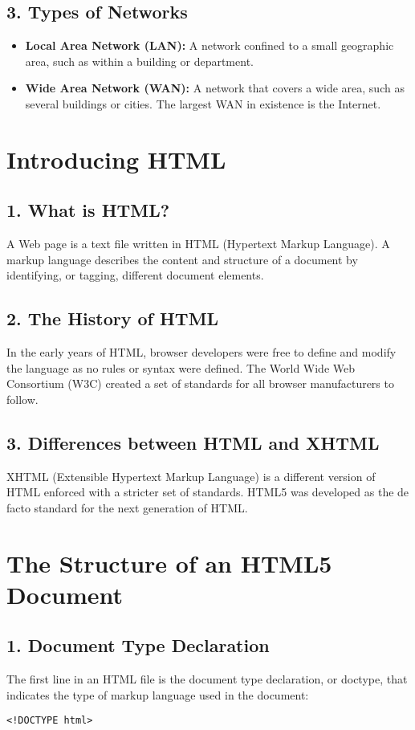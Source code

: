 \documentclass{article}
\begin{document}
\subsection*{3. Types of Networks}
\begin{itemize}
    \item \textbf{Local Area Network (LAN):} A network confined to a small geographic area, such as within a building or department.
    \item \textbf{Wide Area Network (WAN):} A network that covers a wide area, such as several buildings or cities. The largest WAN in existence is the Internet.
\end{itemize}

\section{Introducing HTML}
\subsection*{1. What is HTML?}
A Web page is a text file written in HTML (Hypertext Markup Language). A markup language describes the content and structure of a document by identifying, or tagging, different document elements.

\subsection*{2. The History of HTML}
In the early years of HTML, browser developers were free to define and modify the language as no rules or syntax were defined. The World Wide Web Consortium (W3C) created a set of standards for all browser manufacturers to follow.

\subsection*{3. Differences between HTML and XHTML}
XHTML (Extensible Hypertext Markup Language) is a different version of HTML enforced with a stricter set of standards. HTML5 was developed as the de facto standard for the next generation of HTML.

\section{The Structure of an HTML5 Document}
\subsection*{1. Document Type Declaration}
The first line in an HTML file is the document type declaration, or doctype, that indicates the type of markup language used in the document:
\begin{lstlisting}
<!DOCTYPE html>
\end{lstlisting}
\end{document}
